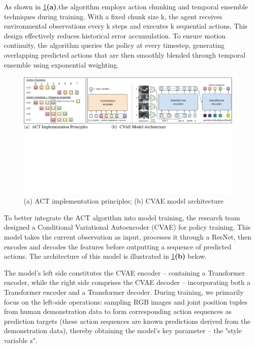 \documentclass[runningheads]{llncs}
\begin{document}
 As shown in \cref{fig1}\textbf{(a)},the algorithm employs action chunking and temporal ensemble techniques during training. With a fixed chunk size k, the agent receives environmental observations every k steps and executes k sequential actions. This design effectively reduces historical error accumulation. To ensure motion continuity, the algorithm queries the policy at every timestep, generating overlapping predicted actions that are then smoothly blended through temporal ensemble using exponential weighting.

\begin{figure}
\includegraphics[width=\textwidth]{fig1.pdf}
\caption{(a) ACT implementation principles; (b) CVAE model architecture} \label{fig1}
\end{figure}


To better integrate the ACT algorithm into model training, the research team designed a Conditional Variational Autoencoder (CVAE) for policy training. This model takes the current observation as input, processes it through a ResNet, then encodes and decodes the features before outputting a sequence of predicted actions. The architecture of this model is illustrated in \cref{fig1}\textbf{(b)} below.



The model's left side constitutes the CVAE encoder – containing a Transformer encoder, while the right side comprises the CVAE decoder – incorporating both a Transformer encoder and a Transformer decoder. During training, we primarily focus on the left-side operations: sampling RGB images and joint position tuples from human demonstration data to form corresponding action sequences as prediction targets (these action sequences are known predictions derived from the demonstration data), thereby obtaining the model's key parameter – the "style variable z".
\end{document}
